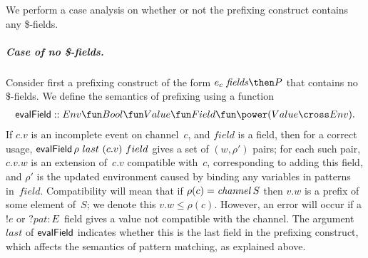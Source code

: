   We perform a case analysis on whether or not the prefixing construct
  contains any \$-fields.


\subparagraph{Case of no \$-fields.} 

Consider first a prefixing construct of the form ${e_c~{\it fields} \then P}$
that contains no $\$$-fields.  We define the semantics of prefixing using a
function
\[
  \evalField :: 
    \begin{align}
    Env \fun Bool \fun Value \fun Field \fun  \power (Value \cross Env).
    \end{align}
\]
If $c.v$ is an incomplete event on channel~$c$, and $field$ is a field, then
for a correct usage, $\mathop{\sf evalField} \rho~last~(c.v)~field$ gives a set of
$(w,\rho')$ pairs; for each such pair, $c.v.w$ is an extension of~$c.v$
compatible with~$c$, corresponding to adding this field, and $\rho'$ is the
updated environment caused by binding any variables in patterns in~$field$.
Compatibility will mean that if $\rho(c) = \mathop{\it channel} S$ then $v.w$ is a prefix
of some element of~$S$; we denote this $v.w \le \rho(c)$.  However, an error
will occur if a $!e$ or $?pat:E$~field gives a value not compatible with the
channel.  The argument~$last$ of $\mathop{\sf evalField}$ indicates whether this is the
last field in the prefixing construct, which affects the semantics of pattern
matching, as explained above.


